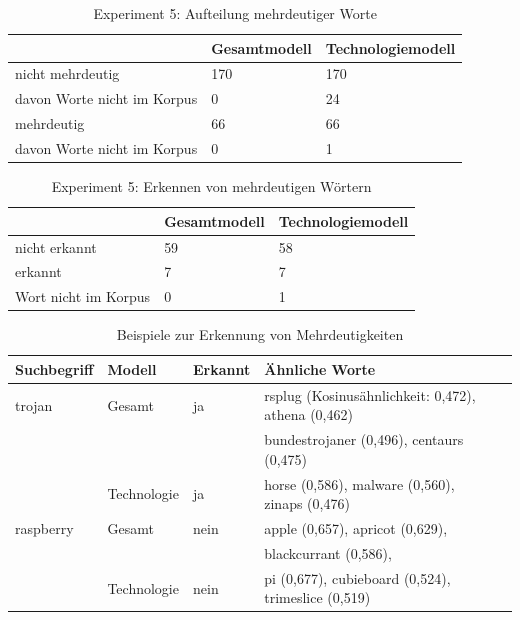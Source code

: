 \documentclass[12pt,a4paper]{report}
\begin{document}
		
		\begin{table}[h]
\caption{Experiment 5: Aufteilung mehrdeutiger Worte}
\label{tab:experiment51}
\begin{center}
\begin{tabular}{|l||l|l|}
\hline
				& \textbf{Gesamtmodell}		  & \textbf{Technologiemodell}   \\

\hline

 nicht mehrdeutig & 170 & 170\\
 
davon Worte nicht im Korpus& 0   	& 24   \\
 \hline
 mehrdeutig & 66   	& 66 \\
davon Worte nicht im Korpus& 0   	& 1   \\
 \hline

\end{tabular}
\end{center}
\end{table}
		\begin{table}[h]
\caption{Experiment 5: Erkennen von mehrdeutigen Wörtern}
\label{tab:experiment52}
\begin{center}
\begin{tabular}{|l||l|l|}
\hline

	& \textbf{Gesamtmodell}	 	& \textbf{Technologiemodell}   \\

 \hline
 nicht erkannt & 59 &   58 \\
 \hline
 erkannt & 7 & 7  \\
\hline
 Wort nicht im Korpus & 0 & 1 \\
 \hline
\end{tabular}
\end{center}
\end{table}
		
\begin{table}[H]
\caption{Beispiele zur Erkennung von Mehrdeutigkeiten}
\label{tab:bspMehrdeutigkeiten}
\begin{center}
\begin{tabular}{|l||l|l|l|l|}
\hline
\textbf{Suchbegriff} & \textbf{Modell} & \textbf{Erkannt} & \textbf{Ähnliche Worte}   \\
\hline
 trojan & Gesamt & ja &rsplug (Kosinusähnlichkeit: 0,472), athena (0,462)\\
 &	&	& bundestrojaner (0,496), centaurs (0,475) \\
 &  Technologie & ja & horse (0,586), malware (0,560), zinaps (0,476)\\
 \hline
 
raspberry& Gesamt& nein & apple (0,657), apricot (0,629), \\
&&&blackcurrant (0,586),  \\
&Technologie & nein & pi (0,677), cubieboard (0,524), trimeslice (0,519)\\
\hline
 
\end{tabular}
\end{center}
\end{table}
		
\end{document}
